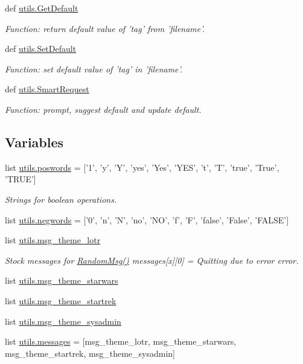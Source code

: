 \begin{DoxyCompactItemize}
def \hyperlink{namespaceutils_aa33e3686e3ca20a547ded84acc99e6b9}{utils.\-Get\-Default}
\begin{DoxyCompactList}\small\item\em \-Function\-: return default value of 'tag' from 'filename'. \end{DoxyCompactList}\item 
def \hyperlink{namespaceutils_a4d3b9e6523229f8e31ec3c6e3d9de270}{utils.\-Set\-Default}
\begin{DoxyCompactList}\small\item\em \-Function\-: set default value of 'tag' in 'filename'. \end{DoxyCompactList}\item 
def \hyperlink{namespaceutils_aea9a2322958457ae1e080284cd076476}{utils.\-Smart\-Request}
\begin{DoxyCompactList}\small\item\em \-Function\-: prompt, suggest default and update default. \end{DoxyCompactList}\end{DoxyCompactItemize}
\subsection*{\-Variables}
\begin{DoxyCompactItemize}
\item 
list \hyperlink{namespaceutils_a2b1e85a9f2279ea635c53853c81ce829}{utils.\-poswords} = \mbox{[}'1', 'y', '\-Y', 'yes', '\-Yes', '\-Y\-E\-S', 't', '\-T', 'true', '\-True', '\-T\-R\-U\-E'\mbox{]}
\begin{DoxyCompactList}\small\item\em \-Strings for boolean operations. \end{DoxyCompactList}\item 
list \hyperlink{namespaceutils_ac5349eff7e6e2f70d80d31ece6d91b0d}{utils.\-negwords} = \mbox{[}'0', 'n', '\-N', 'no', '\-N\-O', 'f', '\-F', 'false', '\-False', '\-F\-A\-L\-S\-E'\mbox{]}
\item 
list \hyperlink{namespaceutils_a5d8a2a3ac46fbc8e7280b92c7e958fb1}{utils.\-msg\-\_\-theme\-\_\-lotr}
\begin{DoxyCompactList}\small\item\em \-Stock messages for \hyperlink{namespaceutils_a17b230eb88f99a55015827768f6d5c6e}{\-Random\-Msg()} messages\mbox{[}x\mbox{]}\mbox{[}0\mbox{]} = \-Quitting due to error error. \end{DoxyCompactList}\item 
list \hyperlink{namespaceutils_aae71d893a1a1f36409c41ce9f00c39d0}{utils.\-msg\-\_\-theme\-\_\-starwars}
\item 
list \hyperlink{namespaceutils_a539e6ad28cc48419af0d7577e82852ed}{utils.\-msg\-\_\-theme\-\_\-startrek}
\item 
list \hyperlink{namespaceutils_ae43b30d88f664df16499f8abb60e0c12}{utils.\-msg\-\_\-theme\-\_\-sysadmin}
\item 
list \hyperlink{namespaceutils_ac2d8fb5f5c3b7e5519dc8d06afb69703}{utils.\-messages} = \mbox{[}msg\-\_\-theme\-\_\-lotr, msg\-\_\-theme\-\_\-starwars, msg\-\_\-theme\-\_\-startrek, msg\-\_\-theme\-\_\-sysadmin\mbox{]}
\end{DoxyCompactItemize}
